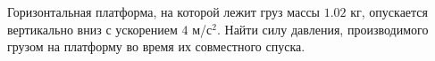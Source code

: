 Горизонтальная платформа, на которой лежит груз массы $1.02$ кг, опускается вертикально вниз с ускорением $4$ м/с$^2$.
Найти силу давления, производимого грузом на платформу во время их совместного спуска.
